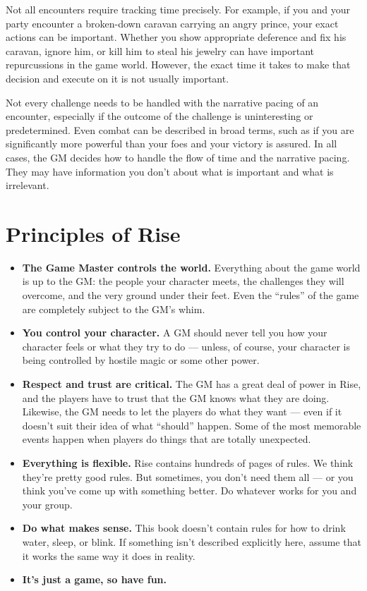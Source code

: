   Not all encounters require tracking time precisely.
  For example, if you and your party encounter a broken-down caravan carrying an angry prince, your exact actions can be important.
  Whether you show appropriate deference and fix his caravan, ignore him, or kill him to steal his jewelry can have important repurcussions in the game world.
  However, the exact time it takes to make that decision and execute on it is not usually important.

  Not every challenge needs to be handled with the narrative pacing of an encounter, especially if the outcome of the challenge is uninteresting or predetermined.
  Even combat can be described in broad terms, such as if you are significantly more powerful than your foes and your victory is assured.
  In all cases, the GM decides how to handle the flow of time and the narrative pacing.
  They may have information you don't about what is important and what is irrelevant.

\section{Principles of Rise}

  \begin{itemize}
    \item \textbf{The Game Master controls the world.} Everything about the game world is up to the GM\@: the people your character meets, the challenges they will overcome, and the very ground under their feet.
      Even the ``rules'' of the game are completely subject to the GM's whim.
    \item \textbf{You control your character.} A GM should never tell you how your character feels or what they try to do --- unless, of course, your character is being controlled by hostile magic or some other power.
    \item \textbf{Respect and trust are critical.} The GM has a great deal of power in Rise, and the players have to trust that the GM knows what they are doing.
      Likewise, the GM needs to let the players do what they want --- even if it doesn't suit their idea of what ``should'' happen.
      Some of the most memorable events happen when players do things that are totally unexpected.
    \item \textbf{Everything is flexible.} Rise contains hundreds of pages of rules.
      We think they're pretty good rules.
      But sometimes, you don't need them all --- or you think you've come up with something better.
      Do whatever works for you and your group.
    \item \textbf{Do what makes sense.} This book doesn't contain rules for how to drink water, sleep, or blink.
      If something isn't described explicitly here, assume that it works the same way it does in reality.
    \item \textbf{It's just a game, so have fun.}
  \end{itemize}

